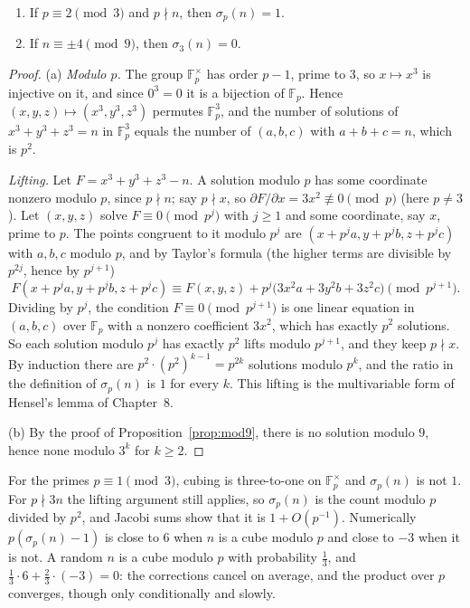 \begin{proposition}\label{prop:localdens}
\begin{enumerate}[label=(\alph*)]
\item If $p\equiv2\pmod3$ and $p\nmid n$, then $\sigma_p(n)=1$.
\item If $n\equiv\pm4\pmod9$, then $\sigma_3(n)=0$.
\end{enumerate}
\end{proposition}
\begin{proof}
(a) \emph{Modulo $p$.} The group $\mathbb F_p^\times$ has order $p-1$, prime to $3$, so $x\mapsto x^3$ is injective on it, and since
$0^3=0$ it is a bijection of $\mathbb F_p$. Hence $(x,y,z)\mapsto(x^3,y^3,z^3)$ permutes $\mathbb F_p^3$, and the number of
solutions of $x^3+y^3+z^3=n$ in $\mathbb F_p^3$ equals the number of $(a,b,c)$ with $a+b+c=n$, which is $p^2$.

\emph{Lifting.} Let $F=x^3+y^3+z^3-n$. A solution modulo $p$ has some coordinate nonzero modulo $p$, since $p\nmid n$; say
$p\nmid x$, so $\partial F/\partial x=3x^2\not\equiv0\pmod p$ (here $p\ne3$). Let $(x,y,z)$ solve $F\equiv0\pmod{p^j}$ with $j\ge1$ and
some coordinate, say $x$, prime to $p$. The points congruent to it modulo $p^j$ are $(x+p^ja,y+p^jb,z+p^jc)$ with $a,b,c$ modulo
$p$, and by Taylor's formula (the higher terms are divisible by $p^{2j}$, hence by $p^{j+1}$)
\[
F(x+p^ja,y+p^jb,z+p^jc)\equiv F(x,y,z)+p^j\bigl(3x^2a+3y^2b+3z^2c\bigr)\pmod{p^{j+1}}.
\]
Dividing by $p^j$, the condition $F\equiv0\pmod{p^{j+1}}$ is one linear equation in $(a,b,c)$ over $\mathbb F_p$ with a nonzero
coefficient $3x^2$, which has exactly $p^2$ solutions. So each solution modulo $p^j$ has exactly $p^2$ lifts modulo $p^{j+1}$, and
they keep $p\nmid x$. By induction there are $p^2\cdot(p^2)^{k-1}=p^{2k}$ solutions modulo $p^k$, and the ratio in the definition
of $\sigma_p(n)$ is $1$ for every $k$. This lifting is the multivariable form of Hensel's lemma of Chapter~8.

(b) By the proof of Proposition~\ref{prop:mod9}, there is no solution modulo $9$, hence none modulo $3^k$ for $k\ge2$.
\end{proof}

For the primes $p\equiv1\pmod3$, cubing is three-to-one on $\mathbb F_p^\times$ and $\sigma_p(n)$ is not $1$. For $p\nmid3n$ the
lifting argument still applies, so $\sigma_p(n)$ is the count modulo $p$ divided by $p^2$, and Jacobi sums show that it is
$1+O(p^{-1})$. Numerically $p(\sigma_p(n)-1)$ is close to $6$ when $n$ is a cube modulo $p$ and close to $-3$ when it is not. A
random $n$ is a cube modulo $p$ with probability $\frac13$, and $\frac13\cdot6+\frac23\cdot(-3)=0$: the corrections cancel on
average, and the product over $p$ converges, though only conditionally and slowly.

